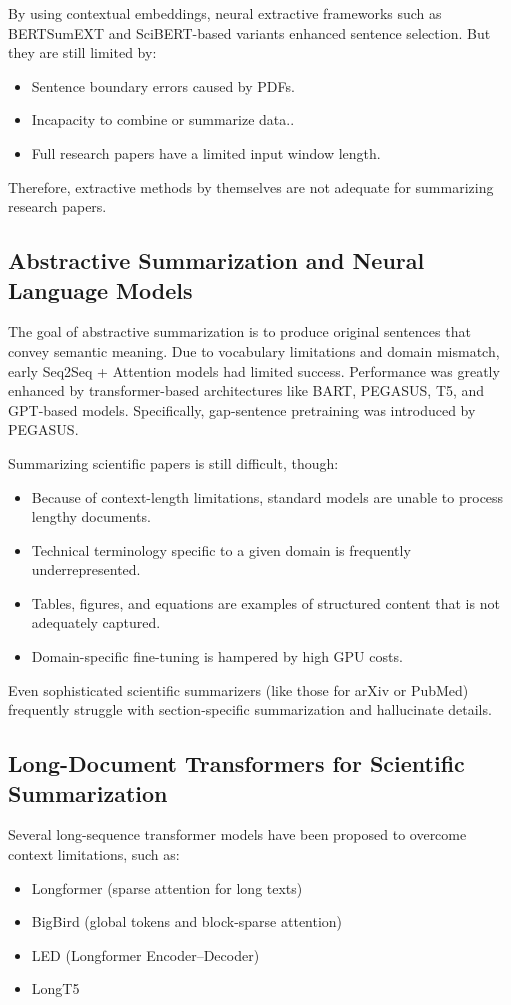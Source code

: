\documentclass[conference]{IEEEtran}
\begin{document}
By using contextual embeddings, neural extractive frameworks such as BERTSumEXT and SciBERT-based variants enhanced sentence selection. But they are still limited by:
\begin{itemize}
    \item Sentence boundary errors caused by PDFs.
    \item Incapacity to combine or summarize data..
    \item Full research papers have a limited input window length.
\end{itemize}

Therefore, extractive methods by themselves are not adequate for summarizing research papers.

\subsection{Abstractive Summarization and Neural Language Models}
The goal of abstractive summarization is to produce original sentences that convey semantic meaning. Due to vocabulary limitations and domain mismatch, early Seq2Seq + Attention models had limited success. Performance was greatly enhanced by transformer-based architectures like BART, PEGASUS, T5, and GPT-based models. Specifically, gap-sentence pretraining was introduced by PEGASUS. 

Summarizing scientific papers is still difficult, though:
\begin{itemize}
    \item Because of context-length limitations, standard models are unable to process lengthy documents.
    \item Technical terminology specific to a given domain is frequently underrepresented.
    \item Tables, figures, and equations are examples of structured content that is not adequately captured.
    \item Domain-specific fine-tuning is hampered by high GPU costs.
\end{itemize}

Even sophisticated scientific summarizers (like those for arXiv or PubMed) frequently struggle with section-specific summarization and hallucinate details.

\subsection{Long-Document Transformers for Scientific Summarization}
Several long-sequence transformer models have been proposed to overcome context limitations, such as:
\begin{itemize}
    \item Longformer (sparse attention for long texts)
    \item BigBird (global tokens and block-sparse attention)
    \item LED (Longformer Encoder--Decoder)
    \item LongT5
\end{itemize}
\end{document}
